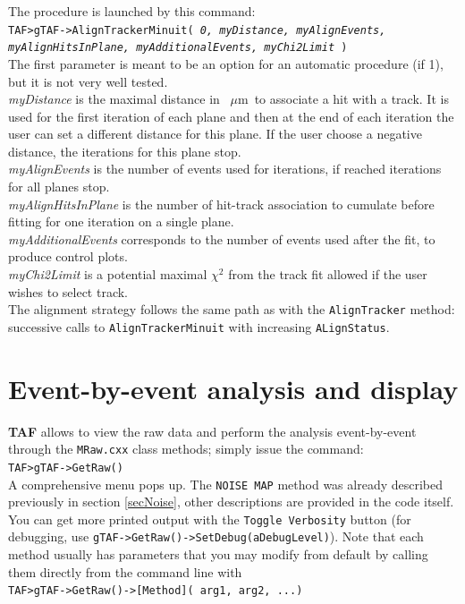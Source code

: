 \documentclass[a4paper, 12pt, twoside]{article}
\def\mm{~$\mu$m}
\newcommand{\TAF}{{\bf TAF }}
\begin{document}
\noindent
The procedure is launched by this command:\\
{\tt TAF>gTAF->AlignTrackerMinuit( {\it 0, myDistance, myAlignEvents, myAlignHitsInPlane, myAdditionalEvents, myChi2Limit} )}\\

\noindent
The first parameter is meant to be an option for an automatic procedure (if 1), but  it is not very well tested.\\
{\it myDistance} is the maximal distance in \mm\ to associate a hit with a track. It is used for the first iteration of each plane and then at the end of each iteration the user can set a different distance for this plane. If the user choose a negative distance, the iterations for this plane stop.\\
{\it myAlignEvents} is the number of events used for iterations, if reached iterations for all planes stop.\\
{\it myAlignHitsInPlane} is the number of hit-track association to cumulate before fitting for one iteration on a single plane.\\
{\it myAdditionalEvents} corresponds to the number of events used after the fit, to produce control plots.\\
{\it myChi2Limit} is a potential maximal $\chi^{2}$ from the track fit allowed if the user wishes to select track.\\

\noindent
The alignment strategy follows the same path as with the {\tt AlignTracker} method: successive calls to {\tt AlignTrackerMinuit} with increasing {\tt ALignStatus}. 


\vspace{2cm}

\section{Event-by-event analysis and display}
\label{secEbyE}

\TAF allows to view the raw data and perform the analysis event-by-event through the {\tt MRaw.cxx} class methods; simply issue the command:\\
{\tt TAF>gTAF->GetRaw()}\\

\noindent
A comprehensive menu pops up. The {\tt NOISE MAP} method was already described previously in section \ref{secNoise}, other descriptions are provided in the code itself. You can get more printed output with the {\tt Toggle Verbosity} button (for debugging, use {\tt gTAF->GetRaw()->SetDebug(aDebugLevel)}). Note that each method usually has parameters that you may modify from default by calling them directly from the command line with\\
{\tt TAF>gTAF->GetRaw()->[Method]( arg1, arg2, ...)}\\
\end{document}
